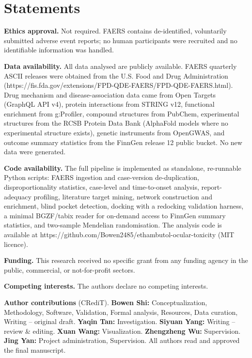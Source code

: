 \documentclass[utf8]{FrontiersinVancouver}
\begin{document}
\section{Statements}

\textbf{Ethics approval.} Not required. FAERS contains de-identified, voluntarily submitted adverse event reports; no human participants were recruited and no identifiable information was handled.

\textbf{Data availability.} All data analysed are publicly available. FAERS quarterly ASCII releases were obtained from the U.S. Food and Drug Administration (https://fis.fda.gov/extensions/FPD-QDE-FAERS/FPD-QDE-FAERS.html). Drug mechanism and disease-association data came from Open Targets (GraphQL API v4), protein interactions from STRING v12, functional enrichment from g:Profiler, compound structures from PubChem, experimental structures from the RCSB Protein Data Bank (AlphaFold models where no experimental structure exists), genetic instruments from OpenGWAS, and outcome summary statistics from the FinnGen release 12 public bucket. No new data were generated.

\textbf{Code availability.} The full pipeline is implemented as standalone, re-runnable Python scripts: FAERS ingestion and case-version de-duplication, disproportionality statistics, case-level and time-to-onset analysis, report-adequacy profiling, literature target mining, network construction and enrichment, blind pocket detection, docking with a redocking validation harness, a minimal BGZF/tabix reader for on-demand access to FinnGen summary statistics, and two-sample Mendelian randomisation. The analysis code is available at https://github.com/Bowen2485/ethambutol-ocular-toxicity (MIT licence).

\textbf{Funding.} This research received no specific grant from any funding agency in the public, commercial, or not-for-profit sectors.

\textbf{Competing interests.} The authors declare no competing interests.

\textbf{Author contributions} (CRediT). \textbf{Bowen Shi:} Conceptualization, Methodology, Software, Validation, Formal analysis, Resources, Data curation, Writing -- original draft. \textbf{Yaqin Tan:} Investigation. \textbf{Siyuan Yang:} Writing -- review \& editing. \textbf{Xuan Wang:} Visualization. \textbf{Zhengzheng Wu:} Supervision. \textbf{Jing Yan:} Project administration, Supervision. All authors read and approved the final manuscript.
\end{document}
